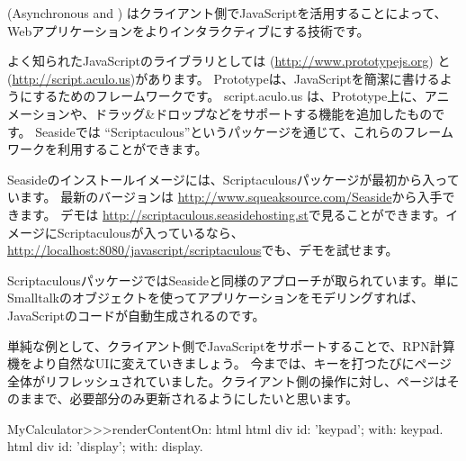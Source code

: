 \documentclass[a4paper,10pt,twoside]{book}
\begin{document}
 (Asynchronous  and ) はクライアント側でJavaScriptを活用することによって、Webアプリケーションをよりインタラクティブにする技術です。

よく知られたJavaScriptのライブラリとしては  (\url{http://www.prototypejs.org}) と  (\url{http://script.aculo.us})があります。
Prototypeは、JavaScriptを簡潔に書けるようにするためのフレームワークです。
script.aculo.us は、Prototype上に、アニメーションや、ドラッグ&ドロップなどをサポートする機能を追加したものです。 Seasideでは ``Scriptaculous''というパッケージを通じて、これらのフレームワークを利用することができます。

Seasideのインストールイメージには、Scriptaculousパッケージが最初から入っています。
最新のバージョンは \url{http://www.squeaksource.com/Seaside}から入手できます。
デモは \url{http://scriptaculous.seasidehosting.st}で見ることができます。イメージにScriptaculousが入っているなら、\url{http://localhost:8080/javascript/scriptaculous}でも、デモを試せます。

ScriptaculousパッケージではSeasideと同様のアプローチが取られています。単にSmalltalkのオブジェクトを使ってアプリケーションをモデリングすれば、JavaScriptのコードが自動生成されるのです。

単純な例として、クライアント側でJavaScriptをサポートすることで、RPN計算機をより自然なUIに変えていきましょう。
今までは、キーを打つたびにページ全体がリフレッシュされていました。クライアント側の操作に対し、ページはそのままで、必要部分のみ更新されるようにしたいと思います。


\begin{code}{}
MyCalculator>>>renderContentOn: html
	html div id: 'keypad'; with: keypad.
	html div id: 'display'; with: display.	
\end{code}

\end{document}
